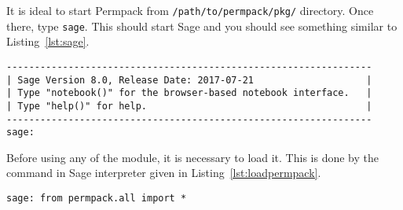 \documentclass[12pt, a4paper, twoside]{report}
\begin{document}
It is ideal to start Permpack from \texttt{/path/to/permpack/pkg/} directory. Once there, type \texttt{sage}. This should start Sage and you should see something similar to Listing~\ref{lst:sage}.
 {}
\begin{lstlisting}
-----------------------------------------------------------------
| Sage Version 8.0, Release Date: 2017-07-21                    |
| Type "notebook()" for the browser-based notebook interface.   |
| Type "help()" for help.                                       |
-----------------------------------------------------------------
sage:
\end{lstlisting}

Before using any of the module, it is necessary to load it. This is done by the command in Sage interpreter given in Listing~\ref{lst:loadpermpack}.
 {}
\begin{lstlisting}
sage: from permpack.all import *
\end{lstlisting}
\end{document}
